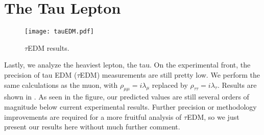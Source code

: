 \section{The Tau Lepton}
\begin{figure}[p]
    \centering
    \texttt{[image: tauEDM.pdf]}
    \caption{\(\tau \)EDM results.}
    \label{fig:tauEDM}
\end{figure}
Lastly, we analyze the heaviest lepton, the tau. 
On the experimental front, the precision of tau EDM (\(\tau \)EDM) measurements are still pretty low.
We perform the same calculations as the muon, with \(\rho_{\mu\mu} = i\lambda_{\mu} \) replaced by \(\rho_{\tau\tau} = i\lambda_{\tau} \).
Results are shown in .
As seen in the figure, our predicted values are still several orders of magnitude below current experimental results.
Further precision or methodology improvements are required for a more fruitful analysis of \(\tau \)EDM, so we just present our results here without much further comment.
